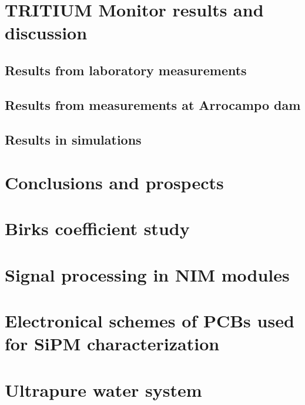 \documentclass[12pt,a4paper]{book}
\begin{document}
\chapter[Results and discussion]{TRITIUM Monitor results and discussion}\label{chap:Results}
	\section{Results from laboratory measurements}
	\newpage
		
	\section[Results in Arrocampo dam]{Results from measurements at Arrocampo dam}
	\newpage
	
	\section{Results in simulations}
	\newpage		

\chapter{Conclusions and prospects}  \label{chap:Conclusions}

\newpage


\appendix
\appendixpage
\noappendicestocpagenum
\addappheadtotoc

\chapter{Birks coefficient study}\label{App:BirksA}


\chapter{Signal processing in NIM modules}\label{App:ElectronicModulesNIM}


\chapter{Electronical schemes of PCBs used for SiPM characterization}\label{App:ElectronicalSchemesSiPMPCBs}


\chapter{Ultrapure water system }\label{App:UltraPureWaterSystem}



\end{document}
